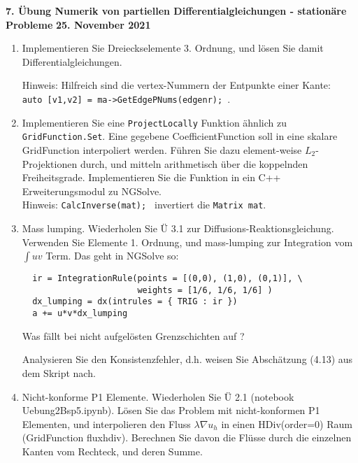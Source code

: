 \documentclass[11pt,a4paper]{report}
\begin{document}
\begin{center}
\textbf{7. \"Ubung Numerik von partiellen Differentialgleichungen - station\"are Probleme} \newline 
\textbf{25. November 2021}
\end{center}

\setcounter{enumi}{4}

\begin{enumerate}

\item Implementieren Sie Dreieckselemente 3. Ordnung, und l\"osen Sie
  damit Differentialgleichungen.

  Hinweis: Hilfreich sind die vertex-Nummern der Entpunkte einer
  Kante: \\  {\tt  auto [v1,v2] = ma->GetEdgePNums(edgenr); }.

  
\item Implementieren Sie eine {\tt ProjectLocally} Funktion \"ahnlich
  zu {\tt GridFunction.Set}. Eine gegebene
  CoefficientFunction soll in eine skalare GridFunction interpoliert
  werden. F\"uhren Sie dazu element-weise $L_2$-Projektionen durch,
  und mitteln arithmetisch \"uber die koppelnden
  Freiheitsgrade. Implementieren Sie die Funktion in ein C++
  Erweiterungsmodul zu NGSolve. \\
  Hinweis: {\tt CalcInverse(mat); } invertiert die {\tt Matrix mat}.
  
\item Mass lumping. Wiederholen Sie \"U 3.1 zur
  Diffusions-Reaktionsgleichung. Verwenden Sie Elemente 1. Ordnung,
  und mass-lumping zur Integration vom $\int u v$ Term. Das geht in
  NGSolve so:

  \begin{verbatim}
  ir = IntegrationRule(points = [(0,0), (1,0), (0,1)], \
                       weights = [1/6, 1/6, 1/6] )
  dx_lumping = dx(intrules = { TRIG : ir }) 
  a += u*v*dx_lumping
\end{verbatim}

  Was f\"allt bei nicht aufgel\"osten Grenzschichten auf ?

  Analysieren Sie den Konsistenzfehler, d.h. weisen Sie Absch\"atzung
  (4.13) aus dem Skript nach.


\item Nicht-konforme P1 Elemente.  Wiederholen Sie \"U 2.1
  (notebook Uebung2Bsp5.ipynb). L\"osen Sie das Problem mit
  nicht-konformen P1 Elementen, und interpolieren den Fluss $\lambda
  \nabla u_h$ in einen
  HDiv(order=0) Raum (GridFunction fluxhdiv). Berechnen Sie davon die Fl\"usse durch die einzelnen
  Kanten vom Rechteck, und deren Summe.


\end{enumerate}
\end{document}
